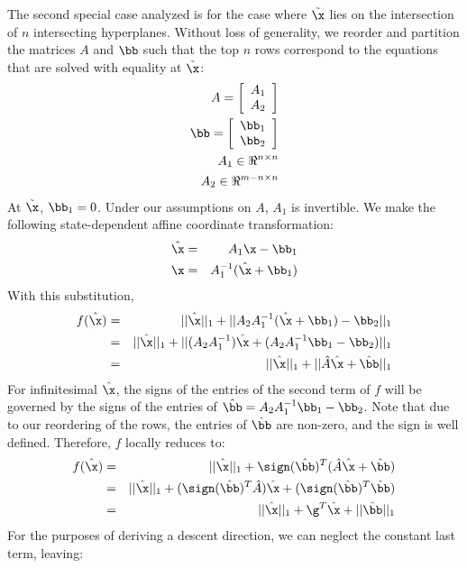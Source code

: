 The second special case analyzed is for the case where $\tilde\x$ lies on the intersection
of $n$ intersecting hyperplanes.  Without loss of generality, we reorder and partition the
matrices $A$ and $\bb$ such that the top $n$ rows correspond to the equations that are solved
with equality at $\tilde\x$:
\begin{eqnarray}
A = \left[\begin{array}{c}A_1 \\ A_2 \end{array}\right]\\
\bb = \left[\begin{array}{c}\bb_1 \\ \bb_2 \end{array}\right]\\
A_1 \in \Re^{n \times n} \\
A_2 \in \Re^{m-n \times n}
\end{eqnarray}
At $\tilde\x$, $\bb_1 = 0$.  Under our assumptions on $A$, $A_1$ is invertible.
We make the following state-dependent affine coordinate transformation:
\begin{eqnarray}
\hat\x &=& A_1\x - \bb_1 \\
\x &=& A_1^{-1} (\hat\x + \bb_1)
\end{eqnarray}
With this substitution,
\begin{eqnarray}
f(\hat\x) &=& ||\hat\x||_1 + ||A_2 A_1^{-1} (\hat\x + \bb_1) - \bb_2 ||_1 \\
&=& ||\hat\x||_1 + || (A_2 A_1^{-1}) \hat\x + (A_2 A_1^{-1} \bb_1 - \bb_2) ||_1 \\
&=& ||\hat\x||_1 + || \hat A \hat\x + \hat \bb ||_1
\end{eqnarray}
For infinitesimal $\hat\x$, the signs of the entries of the second term of $f$ will be
governed by the signs of the entries of $ \hat \bb = A_2 A_1^{-1} \bb_1 - \bb_2$.  
Note that due to our reordering of the rows, the entries of $\hat \bb$ are non-zero,
and the sign is well defined.
Therefore, $f$ locally reduces to:
\begin{eqnarray}
f(\hat\x) &=& ||\hat\x||_1 + \sign(\hat \bb)^T(\hat A \hat \x + \hat \bb) \\
&=& ||\hat\x||_1 + (\sign(\hat \bb)^T \hat A) \hat \x + (\sign(\hat \bb)^T  \hat \bb) \\
&=& ||\hat\x||_1 + \g^T \hat \x + ||\hat \bb||_1
\end{eqnarray}
For the purposes of deriving a descent direction, we can neglect the constant last term, leaving:
